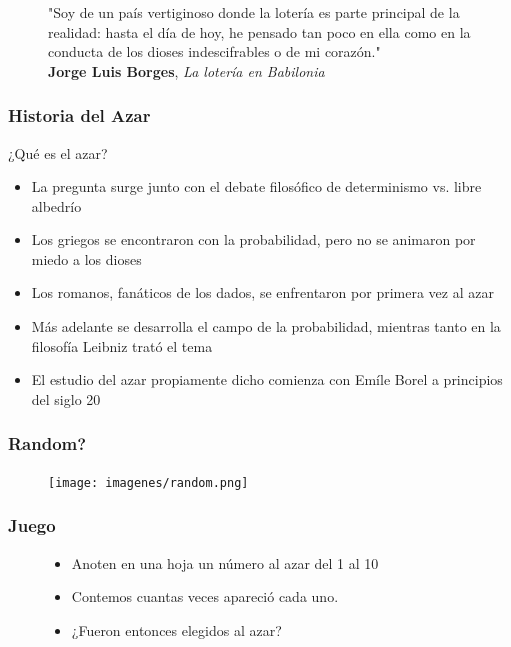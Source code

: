 \begin{frame}
\frametitle{}
\medskip
\begin{figure}[h!]
"Soy de un país vertiginoso donde la lotería es parte principal de la realidad: hasta el día de hoy, he pensado tan poco en ella como en la conducta de los dioses indescifrables o de mi corazón."\\
\textbf{Jorge Luis Borges}, \textit{La lotería en Babilonia}
\end{figure}
\end{frame}

\begin{frame}
\frametitle{Historia del Azar}
\medskip
¿Qué es el azar?\\
\begin{itemize}
	\item La pregunta surge junto con el debate filosófico de determinismo vs. libre albedrío
	\pause
	\item Los griegos se encontraron con la probabilidad, pero no se animaron por miedo a los dioses 
	\pause
	\item Los romanos, fanáticos de los dados, se enfrentaron por primera vez al azar
	\pause
	\item Más adelante se desarrolla el campo de la probabilidad, mientras tanto en la filosofía Leibniz trató el tema
	\pause
	\item El estudio del azar propiamente dicho comienza con Emíle Borel a principios del siglo 20
\end{itemize}
\end{frame}

\begin{frame}
\frametitle{Random?}
\begin{figure}[h!]
\centering
\texttt{[image: imagenes/random.png]}
\end{figure}
\end{frame}

\begin{frame}
\frametitle{Juego}
\medskip
\begin{figure}[h!]
\centering
\begin{itemize}
	\item Anoten en una hoja un número al azar del 1 al 10
	\pause
	\item Contemos cuantas veces apareció cada uno.
	\pause
	\item ¿Fueron entonces elegidos al azar?
\end{itemize}
\end{figure}
\end{frame}

